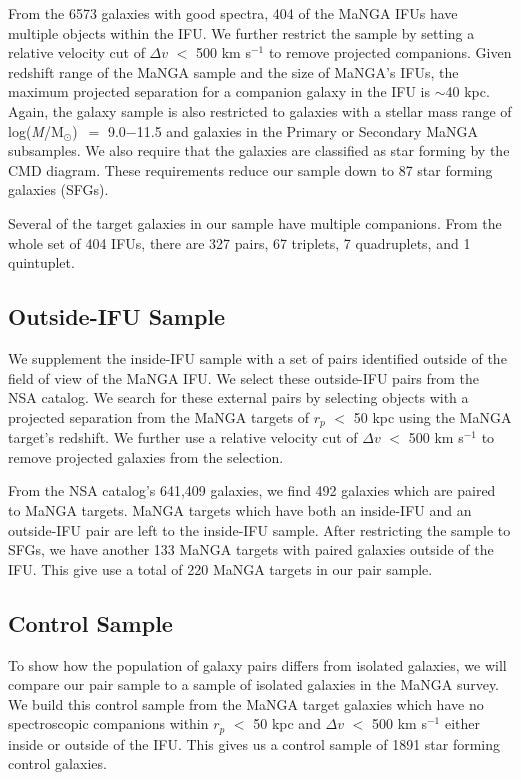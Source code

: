 \documentclass[iop,revtex4,twocolumn,apj,numberedappendix,appendixfloats]{emulateapj}
\newcommand{\logm}{log({\it M}/M$_{\odot}$)}
\begin{document}
From the 6573 galaxies with good spectra, 404 of the MaNGA IFUs have multiple objects within the IFU. We further restrict the sample by setting a relative velocity cut of $\Delta v$ $<$ 500 km s$^{-1}$ to remove projected companions. Given redshift range of the MaNGA sample and the size of MaNGA's IFUs, the maximum projected separation for a companion galaxy in the IFU is $\sim$40 kpc. Again, the galaxy sample is also restricted to galaxies with a stellar mass range of \logm\ $=$ 9.0$-$11.5 and galaxies in the Primary or Secondary MaNGA subsamples. We also require that the galaxies are classified as star forming by the CMD diagram. These requirements reduce our sample down to 87 star forming galaxies (SFGs). 

Several of the target galaxies in our sample have multiple companions. From the whole set of 404 IFUs, there are 327 pairs, 67 triplets, 7 quadruplets, and 1 quintuplet. 

\subsection{Outside-IFU Sample}\label{sec:outside}

We supplement the inside-IFU sample with a set of pairs identified outside of the field of view of the MaNGA IFU. We select these outside-IFU pairs from the NSA catalog. We search for these external pairs by selecting objects with a projected separation from the MaNGA targets of $r_p$ $<$ 50 kpc using the MaNGA target's redshift. We further use a relative velocity cut of $\Delta v$ $<$ 500 km s$^{-1}$ to remove projected galaxies from the selection. 

From the NSA catalog's 641,409 galaxies, we find 492 galaxies which are paired to MaNGA targets. MaNGA targets which have both an inside-IFU and an outside-IFU pair are left to the inside-IFU sample. After restricting the sample to SFGs, we have another 133 MaNGA targets with paired galaxies outside of the IFU. This give use a total of 220 MaNGA targets in our pair sample.

\subsection{Control Sample}\label{sec:control}

To show how the population of galaxy pairs differs from isolated galaxies, we will compare our pair sample to a sample of isolated galaxies in the MaNGA survey. We build this control sample from the MaNGA target galaxies which have no spectroscopic companions within $r_p$ $<$ 50 kpc and $\Delta v$ $<$ 500 km s$^{-1}$ either inside or outside of the IFU. This gives us a control sample of 1891 star forming control galaxies. 
\end{document}
